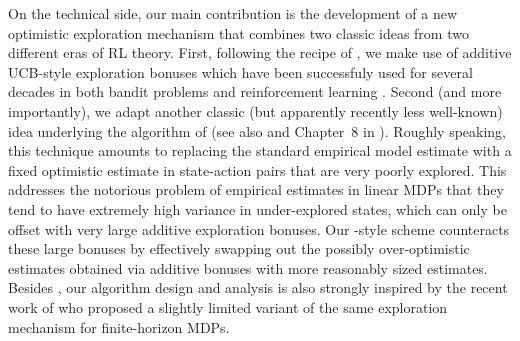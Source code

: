 On the technical side, our main contribution is the development of a new optimistic exploration mechanism that combines two classic ideas from two different eras of RL theory. First, following the recipe of \citet{jin2019provably}, we make use of additive UCB-style exploration bonuses which have been successfuly used for several decades in both bandit problems \citep{LR85,ACF02,A02,dani08stoch,APS11} and reinforcement learning \citep{kaelbling1996reinforcement,Strehl:2008,jaksch10ucrl,azar2017minimax}. Second (and more importantly), we adapt another classic (but apparently recently less well-known) idea underlying the \RMAXalg algorithm of \citet{brafman2002r} (see also \citealp{szita2010model} and Chapter~8 in \citealp{kakade2003sample}). Roughly speaking, this technique amounts to replacing the standard empirical model estimate with a fixed optimistic estimate in state-action pairs that are very poorly explored. This addresses the notorious problem of empirical estimates in linear MDPs that they tend to have extremely high variance in under-explored states, which can only be offset with very large additive exploration bonuses. Our \RMAXalg-style scheme counteracts these large bonuses by effectively swapping out the possibly over-optimistic estimates obtained via additive bonuses with more reasonably sized estimates. Besides \citet{brafman2002r}, our algorithm design and analysis is also strongly inspired by the recent work of \citet{cassel2024warmupfree} who proposed a slightly limited variant of the same exploration mechanism for finite-horizon MDPs.
